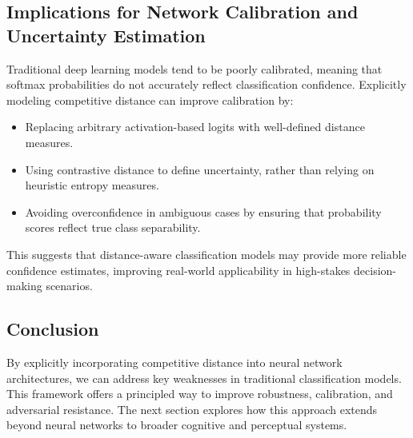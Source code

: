 \subsection{Implications for Network Calibration and Uncertainty Estimation}

Traditional deep learning models tend to be poorly calibrated, meaning that softmax probabilities do not accurately reflect classification confidence. Explicitly modeling competitive distance can improve calibration by:

\begin{itemize}
    \item Replacing arbitrary activation-based logits with well-defined distance measures.
    \item Using contrastive distance to define uncertainty, rather than relying on heuristic entropy measures.
    \item Avoiding overconfidence in ambiguous cases by ensuring that probability scores reflect true class separability.
\end{itemize}

This suggests that distance-aware classification models may provide more reliable confidence estimates, improving real-world applicability in high-stakes decision-making scenarios.

\subsection{Conclusion}

By explicitly incorporating competitive distance into neural network architectures, we can address key weaknesses in traditional classification models. This framework offers a principled way to improve robustness, calibration, and adversarial resistance. The next section explores how this approach extends beyond neural networks to broader cognitive and perceptual systems.
